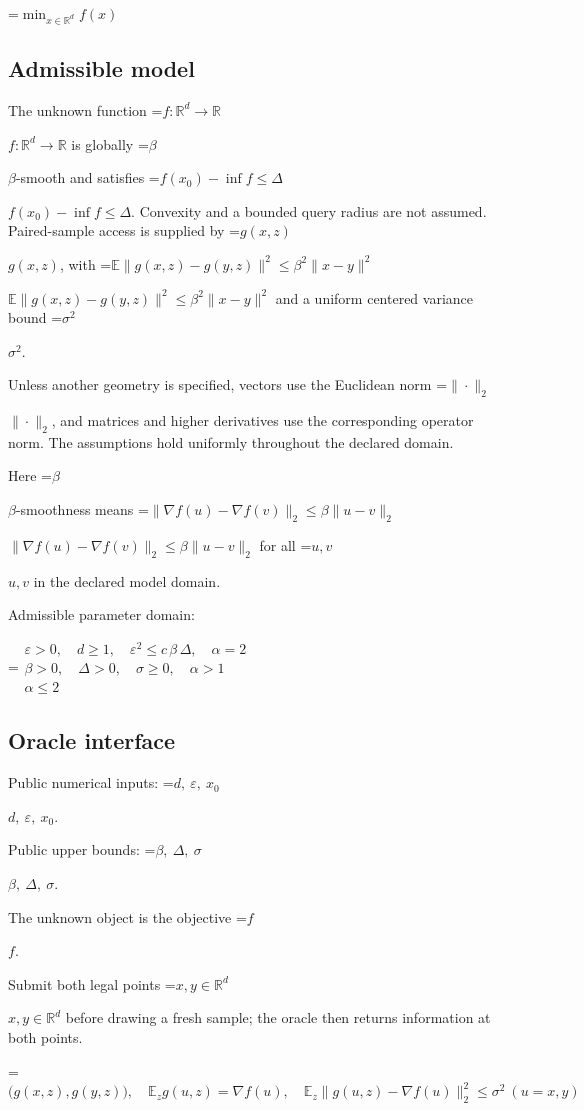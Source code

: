 \documentclass[10pt,a4paper]{article}
\newcommand{\AtlasMath}[1]{\par\begingroup\centering\setbox0=\hbox{$\displaystyle #1$}\ifdim\wd0>1.4\linewidth\typeout{ATLAS WIDE FORMULA: \the\wd0}\fi\ifdim\wd0>\linewidth\resizebox{\linewidth}{!}{\box0}\else\box0\fi\par\endgroup}
\newcommand{\AtlasInlineMath}[1]{\begingroup\setbox0=\hbox{$#1$}\ifdim\wd0>.4\linewidth\endgroup\AtlasMath{#1}\else\endgroup$#1$\fi}
\begin{document}
\AtlasMath{\min_{x\in \mathbb{R}^d}f(x)}


\subsection{Admissible model}
The unknown function \AtlasInlineMath{f:\mathbb R^d\to\mathbb R} is globally \AtlasInlineMath{\beta}-smooth and satisfies \AtlasInlineMath{f(x_0)-\inf f\le\Delta}. Convexity and a bounded query radius are not assumed. Paired-sample access is supplied by \AtlasInlineMath{g(x,z)}, with \AtlasInlineMath{\mathbb E\|g(x,z)-g(y,z)\|^2\le\beta^2\|x-y\|^2} and a uniform centered variance bound \AtlasInlineMath{\sigma^2}.

Unless another geometry is specified, vectors use the Euclidean norm \AtlasInlineMath{\|\cdot\|_2}, and matrices and higher derivatives use the corresponding operator norm. The assumptions hold uniformly throughout the declared domain.

Here \AtlasInlineMath{\beta}-smoothness means \AtlasInlineMath{\|\nabla f(u)-\nabla f(v)\|_2\le\beta\|u-v\|_2} for all \AtlasInlineMath{u,v} in the declared model domain.

Admissible parameter domain:


\AtlasMath{\begin{gathered}\varepsilon > 0,\quad d \ge 1,\quad {\varepsilon}^{2} \le c\,\beta\,\Delta,\quad \alpha = 2\\\beta > 0,\quad \Delta > 0,\quad \sigma \ge 0,\quad \alpha > 1\\\alpha \le 2\end{gathered}}


\subsection{Oracle interface}
Public numerical inputs: \AtlasInlineMath{d,\ \varepsilon,\ x_0}.

Public upper bounds: \AtlasInlineMath{\beta,\ \Delta,\ \sigma}.

The unknown object is the objective \AtlasInlineMath{f}.

Submit both legal points \AtlasInlineMath{x,y\in\mathbb R^d} before drawing a fresh sample; the oracle then returns information at both points.


\AtlasMath{\bigl(g(x,z),g(y,z)\bigr),\quad\mathbb{E}_zg(u,z)=\nabla f(u),\quad\mathbb{E}_z\|g(u,z)-\nabla f(u)\|_2^2\le\sigma^2\ (u=x,y)}
\end{document}
